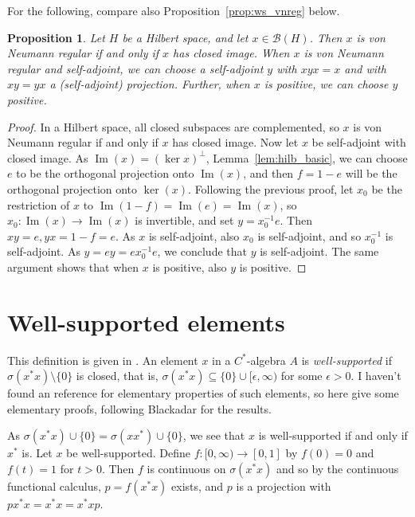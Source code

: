 \documentclass[twoside,a4paper,12pt]{article}
\theoremstyle{plain}
\newtheorem{proposition}{Proposition}[section]
\theoremstyle{definition}
\newcommand{\mc}{\mathcal}
\newcommand{\im}{\operatorname{Im}}
\begin{document}
For the following, compare also Proposition~\ref{prop:ws_vnreg} below.

\begin{proposition}\label{prop:vnreg_hilb}
Let $H$ be a Hilbert space, and let $x\in \mc B(H)$.  Then $x$ is von Neumann regular if and only if $x$ has closed image.  When $x$ is von Neumann regular and self-adjoint, we can choose a self-adjoint $y$ with $xyx=x$ and with $xy = yx$ a (self-adjoint) projection.  Further, when $x$ is positive, we can choose $y$ positive.
\end{proposition}
\begin{proof}
In a Hilbert space, all closed subspaces are complemented, so $x$ is von Neumann regular if and only if $x$ has closed image.  Now let $x$ be self-adjoint with closed image.  As $\im(x) = (\ker x)^\perp$, Lemma~\ref{lem:hilb_basic}, we can choose $e$ to be the orthogonal projection onto $\im(x)$, and then $f=1-e$ will be the orthogonal projection onto $\ker(x)$.  Following the previous proof, let $x_0$ be the restriction of $x$ to $\im(1-f) = \im(e) = \im(x)$, so $x_0 \colon \im(x) \to \im(x)$ is invertible, and set $y = x_0^{-1} e$.  Then $xy=e, yx=1-f = e$.  As $x$ is self-adjoint, also $x_0$ is self-adjoint, and so $x_0^{-1}$ is self-adjoint.  As $y = ey = ex_0^{-1}e$, we conclude that $y$ is self-adjoint.  The same argument shows that when $x$ is positive, also $y$ is positive.
\end{proof}





\clearpage

\section{Well-supported elements}

This definition is given in \cite[Definition~II.3.2.8]{blackadar_enc}.  An element $x$ in a $C^*$-algebra $A$ is \emph{well-supported} if $\sigma(x^*x) \setminus\{0\}$ is closed, that is, $\sigma(x^*x) \subseteq \{0\} \cup [\epsilon,\infty)$ for some $\epsilon>0$.  I haven't found an reference for elementary properties of such elements, so here give some elementary proofs, following Blackadar for the results.

As $\sigma(x^*x) \cup\{0\} = \sigma(xx^*)\cup\{0\}$, we see that $x$ is well-supported if and only if $x^*$ is.  Let $x$ be well-supported.  Define $f\colon [0,\infty) \to [0,1]$ by $f(0)=0$ and $f(t)=1$ for $t>0$.  Then $f$ is continuous on $\sigma(x^*x)$ and so by the continuous functional calculus, $p = f(x^*x)$ exists, and $p$ is a projection with $px^*x = x^*x = x^*xp$.
\end{document}
